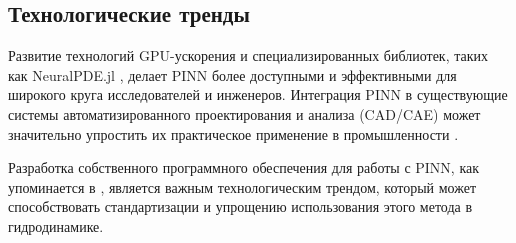 \subsection{Технологические тренды}
Развитие технологий GPU-ускорения и специализированных библиотек, таких как NeuralPDE.jl \cite{neuralpde2023}, делает PINN
более доступными и эффективными для широкого круга исследователей и инженеров. Интеграция PINN в существующие системы
автоматизированного проектирования и анализа (CAD/CAE) может значительно упростить их практическое применение в
промышленности \cite{cuomo2022scientific}.

Разработка собственного программного обеспечения для работы с PINN, как упоминается в \cite{lu2021deepxde}, является важным
технологическим трендом, который может способствовать стандартизации и упрощению использования этого метода в гидродинамике.
